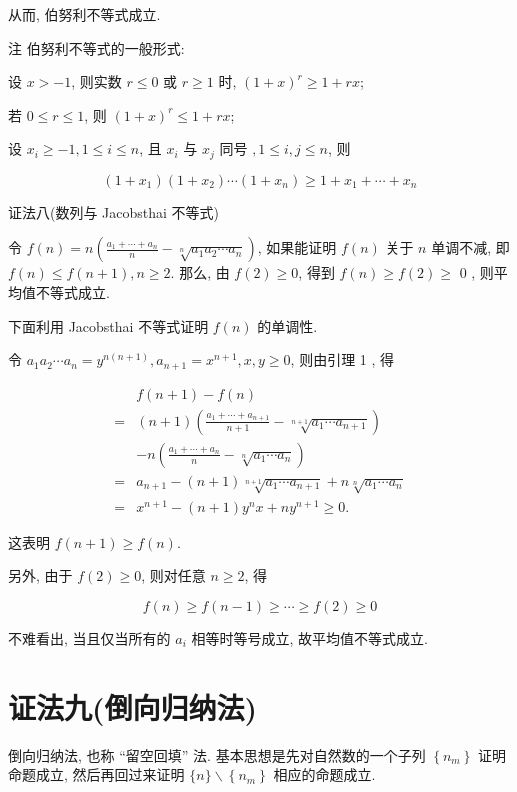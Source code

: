 从而, 伯努利不等式成立.

注 伯努利不等式的一般形式:

设 $x>-1$, 则实数 $r \leqslant 0$ 或 $r \geqslant 1$ 时, $(1+x)^{r} \geqslant 1+r x$;

若 $0 \leqslant r \leqslant 1$, 则 $(1+x)^{r} \leqslant 1+r x$;

设 $x_{i} \geqslant-1,1 \leqslant i \leqslant n$, 且 $x_{i}$ 与 $x_{j}$ 同号 $, 1 \leqslant i, j \leqslant n$, 则

$$
\left(1+x_{1}\right)\left(1+x_{2}\right) \cdots\left(1+x_{n}\right) \geqslant 1+x_{1}+\cdots+x_{n}
$$

证法八(数列与 Jacobsthai 不等式)

令 $f(n)=n\left(\frac{a_{1}+\cdots+a_{n}}{n}-\sqrt[n]{a_{1} a_{2} \cdots a_{n}}\right)$, 如果能证明 $f(n)$ 关于 $n$ 单调不减, 即 $f(n) \leqslant f(n+1), n \geqslant 2$. 那么, 由 $f(2) \geqslant 0$, 得到 $f(n) \geqslant f(2) \geqslant$ 0 , 则平均值不等式成立.

下面利用 Jacobsthai 不等式证明 $f(n)$ 的单调性.

令 $a_{1} a_{2} \cdots a_{n}=y^{n(n+1)}, a_{n+1}=x^{n+1}, x, y \geqslant 0$, 则由引理 1 , 得

$$
\begin{aligned}
& f(n+1)-f(n) \\
= & (n+1)\left(\frac{a_{1}+\cdots+a_{n+1}}{n+1}-\sqrt[n+1]{a_{1} \cdots a_{n+1}}\right) \\
& -n\left(\frac{a_{1}+\cdots+a_{n}}{n}-\sqrt[n]{a_{1} \cdots a_{n}}\right) \\
= & a_{n+1}-(n+1) \sqrt[n+1]{a_{1} \cdots a_{n+1}}+n \sqrt[n]{a_{1} \cdots a_{n}} \\
= & x^{n+1}-(n+1) y^{n} x+n y^{n+1} \geqslant 0 .
\end{aligned}
$$

这表明 $f(n+1) \geqslant f(n)$.

另外, 由于 $f(2) \geqslant 0$, 则对任意 $n \geqslant 2$, 得

$$
f(n) \geqslant f(n-1) \geqslant \cdots \geqslant f(2) \geqslant 0
$$

不难看出, 当且仅当所有的 $a_{i}$ 相等时等号成立, 故平均值不等式成立.

\section*{证法九(倒向归纳法)}
倒向归纳法, 也称 “留空回填” 法. 基本思想是先对自然数的一个子列 $\left\{n_{m}\right\}$ 证明命题成立, 然后再回过来证明 $\{n\} \backslash\left\{n_{m}\right\}$ 相应的命题成立.

